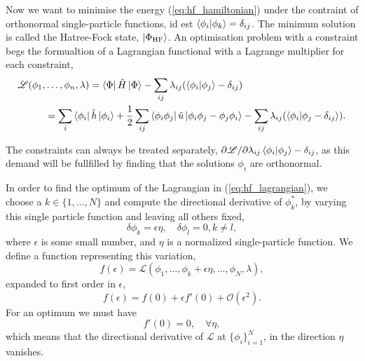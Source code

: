     Now we want to minimise the energy (\autoref{eq:hf_hamiltonian}) under the
    contraint of orthonormal single-particle functions, id est
    $\braket{\phi_i}{\phi_k} = \delta_{ij}$. The minimum solution is called the 
    Hatree-Fock state, $\ket{\Phi_{\text{HF}}}$. An optimisation problem with a 
    constraint begs the formualtion of a Lagrangian functional with a Lagrange
    multiplier for each constraint,
    \begin{equation}
        \label{eq:hf_lagrangian}
        \begin{aligned}
        \mathscr{L}(\phi_1, &\dots, \phi_n, \lambda)
            = \bra{\Phi} \hat{H} \ket{\Phi} 
                - \sum_{ij}\lambda_{ij}(\braket{\phi_i}{\phi_j} - \delta_{ij}) \\
            &= \sum_i \bra{\phi_i} \hat{h} \ket{\phi_i}
                + \frac{1}{2}\sum_{ij} \bra{\phi_i \phi_j} 
                    \hat{u} \ket{\phi_i \phi_j -  \phi_j \phi_i}
                - \sum_{ij} \lambda_{ij} (\braket{\phi_i}{\phi_j - \delta_{ij}}).
        \end{aligned}
    \end{equation}

    The constraints can always be treated separately, 
    $\partial \mathscr{L}/\partial \lambda_{ij} \braket{\phi_i}{\phi_j} - \delta_{ij}$,
    as this demand will be fullfilled by finding that the solutions $\phi_i$ are 
    orthonormal.

    In order to find the optimum of the Lagrangian in (\autoref{eq:hf_lagrangian}),
    we choose a $k \in \{1, \dots, N \}$ and compute the directional derivative of
    $\phi_k^*$, by varying this single particle function and leaving all others fixed,
    \begin{equation}
        \delta \phi_k = \epsilon \eta, \quad \delta \phi_l = 0, k \neq l,
    \end{equation}
    where $\epsilon$ is some small number, and $\eta$ is a normalized single-particle 
    function. We define a function representing this variation,
    \begin{equation}
        \label{eq:variation_hf_lagrangian}
        f(\epsilon) = \mathscr{L} (\phi_1, \dots, \phi_k + \epsilon \eta,
            \dots, \phi_N, \lambda),
    \end{equation}
    expanded to first order in $\epsilon$,
    \begin{equation}
        f(\epsilon) = f(0) + \epsilon f'(0) + \mathscr{O}(\epsilon^2).
    \end{equation}
    For an optimum we must have 
    \begin{equation}
        f'(0) = 0, \quad \forall \eta,
    \end{equation}
    which means that the directional derivative of $\mathscr{L}$ at 
    $\{\phi_i\}_{i=1}^N$, in the direction $\eta$ vanishes.

